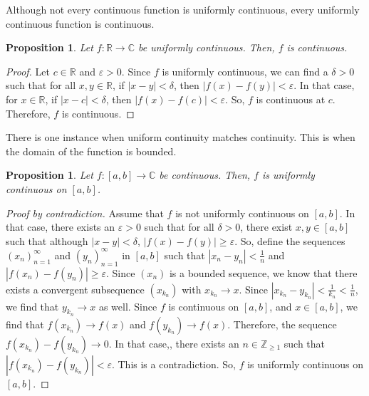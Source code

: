\documentclass[a4paper, openany]{memoir}
\theoremstyle{definition}
\theoremstyle{plain}
\newtheorem{proposition}[definition]{Proposition}
\begin{document}
\noindent Although not every continuous function is uniformly continuous, every uniformly continuous function is continuous.
\begin{proposition}
Let $f: \mathbb{R} \to \mathbb{C}$ be uniformly continuous. Then, $f$ is continuous.
\end{proposition}
\begin{proof}
Let $c \in \mathbb{R}$ and $\varepsilon > 0$. Since $f$ is uniformly continuous, we can find a $\delta > 0$ such that for all $x, y \in \mathbb{R}$, if $|x - y| < \delta$, then $|f(x) - f(y)| < \varepsilon$. In that case, for $x \in \mathbb{R}$, if $|x - c| < \delta$, then $|f(x) - f(c)| < \varepsilon$. So, $f$ is continuous at $c$. Therefore, $f$ is continuous.
\end{proof}
\noindent There is one instance when uniform continuity matches continuity. This is when the domain of the function is bounded.
\begin{proposition}
Let $f: [a, b] \to \mathbb{C}$ be continuous. Then, $f$ is uniformly continuous on $[a, b]$.
\end{proposition}
\begin{proof}[Proof by contradiction]
Assume that $f$ is not uniformly continuous on $[a, b]$. In that case, there exists an $\varepsilon > 0$ such that for all $\delta > 0$, there exist $x, y \in [a, b]$ such that although $|x - y| < \delta$, $|f(x) - f(y)| \geqslant \varepsilon$. So, define the sequences $(x_n)_{n=1}^{\infty}$ and $(y_n)_{n=1}^{\infty}$ in $[a, b]$ such that $|x_n - y_n| < \frac{1}{n}$ and $|f(x_n) - f(y_n)| \geqslant \varepsilon$. Since $(x_n)$ is a bounded sequence, we know that there exists a convergent subsequence $(x_{k_n})$ with $x_{k_n} \to x$. Since $|x_{k_n} - y_{k_n}| < \frac{1}{k_n} < \frac{1}{n}$, we find that $y_{k_n} \to x$ as well. Since $f$ is continuous on $[a, b]$, and $x \in [a, b]$, we find that $f(x_{k_n}) \to f(x)$ and $f(y_{k_n}) \to f(x)$. Therefore, the sequence $f(x_{k_n}) - f(y_{k_n}) \to 0$. In that case,, there exists an $n \in \mathbb{Z}_{\geqslant 1}$ such that $|f(x_{k_n}) - f(y_{k_n})| < \varepsilon$. This is a contradiction. So, $f$ is uniformly continuous on $[a, b]$.
\end{proof}
\end{document}
